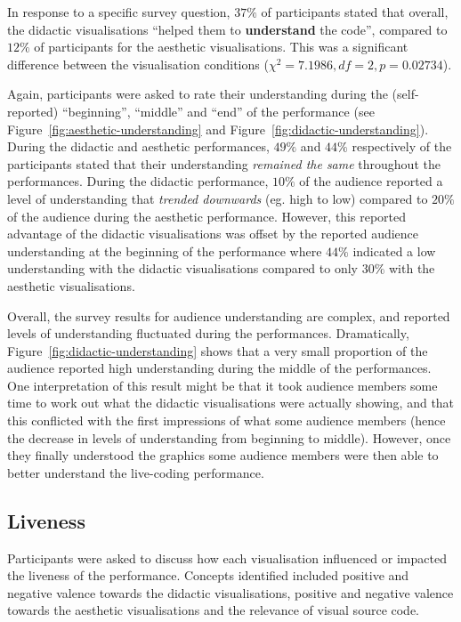 In response to a specific survey question, $37\%$ of participants stated that overall, the didactic visualisations ``helped them to \textbf{understand} the code'', compared to $12\%$ of participants for the aesthetic visualisations. This was a significant difference between the visualisation conditions ($\chi^2=7.1986,df=2,p=0.02734$).

Again, participants were asked to rate their understanding during the (self-reported) ``beginning'', ``middle'' and ``end'' of the performance (see Figure~\ref{fig:aesthetic-understanding} and Figure~\ref{fig:didactic-understanding}). During the didactic and aesthetic performances, $49\%$ and $44\%$ respectively of the participants stated that their understanding \emph{remained the same} throughout the performances. During the didactic performance, $10\%$ of the audience reported a level of understanding that \emph{trended   downwards} (eg. high to low) compared to $20\%$ of the audience during the aesthetic performance. However, this reported advantage of the didactic visualisations was offset by the reported audience understanding at the beginning of the performance where $44\%$ indicated a low understanding with the didactic visualisations compared to only $30\%$ with the aesthetic visualisations. 

Overall, the survey results for audience understanding are complex, and reported levels of understanding fluctuated during the performances. Dramatically, Figure~\ref{fig:didactic-understanding} shows that a very small proportion of the audience reported high understanding during the middle of the performances. One interpretation of this result might be that it took audience members some time to work out what the didactic visualisations were actually showing, and that this conflicted with the first impressions of what some audience members (hence the decrease in levels of understanding from beginning to middle). However, once they finally understood the graphics some audience members were then able to better understand the live-coding performance.

\subsection{Liveness}

Participants were asked to discuss how each visualisation influenced or impacted the liveness of the performance. Concepts identified included positive and negative valence towards the didactic visualisations, positive and negative valence towards the aesthetic visualisations and the relevance of visual source code. 


